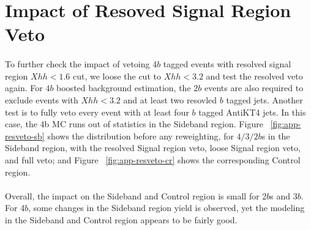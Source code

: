 \section{Impact of Resoved Signal Region Veto }
\label{app:resveto}

\paragraph{}
To further check the impact of vetoing 4$b$ tagged events with resolved signal region $Xhh < 1.6$ cut, we loose the cut to $Xhh < 3.2$ and test the resolved veto again. For $4b$ boosted background estimation, the $2b$ events are also required to exclude events with $Xhh < 3.2$ and at least two resovled $b$ tagged jets. Another test is to fully veto every event with at least four $b$ tagged AntiKT4 jets. In this case, the 4b \ttbar MC runs out of statistics in the Sideband region. Figure ~\ref{fig:app-resveto-sb} shows the distribution before any reweighting, for $4/3/2b$s in the Sideband region, with the resolved Signal region veto, loose Signal region veto, and full veto; and Figure ~\ref{fig:app-resveto-cr} shows the corresponding Control region.

\paragraph{}
Overall, the impact on the Sideband and Control region is small for 2$b$s and 3$b$. For 4$b$, some changes in the Sideband region yield is observed, yet the modeling in the Sideband and Control region appears to be fairly good. 

